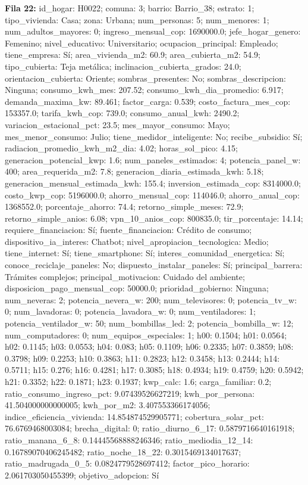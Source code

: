 {\footnotesize\textbf{Fila 22:} id\_hogar: H0022; comuna: 3; barrio: Barrio\_38; estrato: 1; tipo\_vivienda: Casa; zona: Urbana; num\_personas: 5; num\_menores: 1; num\_adultos\_mayores: 0; ingreso\_mensual\_cop: 1690000.0; jefe\_hogar\_genero: Femenino; nivel\_educativo: Universitario; ocupacion\_principal: Empleado; tiene\_empresa: Sí; area\_vivienda\_m2: 60.9; area\_cubierta\_m2: 54.9; tipo\_cubierta: Teja metálica; inclinacion\_cubierta\_grados: 24.0; orientacion\_cubierta: Oriente; sombras\_presentes: No; sombras\_descripcion: Ninguna; consumo\_kwh\_mes: 207.52; consumo\_kwh\_dia\_promedio: 6.917; demanda\_maxima\_kw: 89.461; factor\_carga: 0.539; costo\_factura\_mes\_cop: 153357.0; tarifa\_kwh\_cop: 739.0; consumo\_anual\_kwh: 2490.2; variacion\_estacional\_pct: 23.5; mes\_mayor\_consumo: Mayo; mes\_menor\_consumo: Julio; tiene\_medidor\_inteligente: No; recibe\_subsidio: Sí; radiacion\_promedio\_kwh\_m2\_dia: 4.02; horas\_sol\_pico: 4.15; generacion\_potencial\_kwp: 1.6; num\_paneles\_estimados: 4; potencia\_panel\_w: 400; area\_requerida\_m2: 7.8; generacion\_diaria\_estimada\_kwh: 5.18; generacion\_mensual\_estimada\_kwh: 155.4; inversion\_estimada\_cop: 8314000.0; costo\_kwp\_cop: 5196000.0; ahorro\_mensual\_cop: 114046.0; ahorro\_anual\_cop: 1368552.0; porcentaje\_ahorro: 74.4; retorno\_simple\_meses: 72.9; retorno\_simple\_anios: 6.08; vpn\_10\_anios\_cop: 800835.0; tir\_porcentaje: 14.14; requiere\_financiacion: Sí; fuente\_financiacion: Crédito de consumo; dispositivo\_ia\_interes: Chatbot; nivel\_apropiacion\_tecnologica: Medio; tiene\_internet: Sí; tiene\_smartphone: Sí; interes\_comunidad\_energetica: Sí; conoce\_reciclaje\_paneles: No; dispuesto\_instalar\_paneles: Sí; principal\_barrera: Trámites complejos; principal\_motivacion: Cuidado del ambiente; disposicion\_pago\_mensual\_cop: 50000.0; prioridad\_gobierno: Ninguna; num\_neveras: 2; potencia\_nevera\_w: 200; num\_televisores: 0; potencia\_tv\_w: 0; num\_lavadoras: 0; potencia\_lavadora\_w: 0; num\_ventiladores: 1; potencia\_ventilador\_w: 50; num\_bombillas\_led: 2; potencia\_bombilla\_w: 12; num\_computadores: 0; num\_equipos\_especiales: 1; h00: 0.1504; h01: 0.0564; h02: 0.1145; h03: 0.0553; h04: 0.083; h05: 0.1109; h06: 0.2335; h07: 0.3859; h08: 0.3798; h09: 0.2253; h10: 0.3863; h11: 0.2823; h12: 0.3458; h13: 0.2444; h14: 0.5711; h15: 0.276; h16: 0.4281; h17: 0.3085; h18: 0.4934; h19: 0.4759; h20: 0.5942; h21: 0.3352; h22: 0.1871; h23: 0.1937; kwp\_calc: 1.6; carga\_familiar: 0.2; ratio\_consumo\_ingreso\_pct: 9.07439526627219; kwh\_por\_persona: 41.504000000000005; kwh\_por\_m2: 3.407553366174056; indice\_eficiencia\_vivienda: 14.854874529905771; cobertura\_solar\_pct: 76.6769468003084; brecha\_digital: 0; ratio\_diurno\_6\_17: 0.5879716640161918; ratio\_manana\_6\_8: 0.14445568888246346; ratio\_mediodia\_12\_14: 0.16789070406245482; ratio\_noche\_18\_22: 0.3015469134017637; ratio\_madrugada\_0\_5: 0.0824779528697412; factor\_pico\_horario: 2.061703050455399; objetivo\_adopcion: Sí\par}
